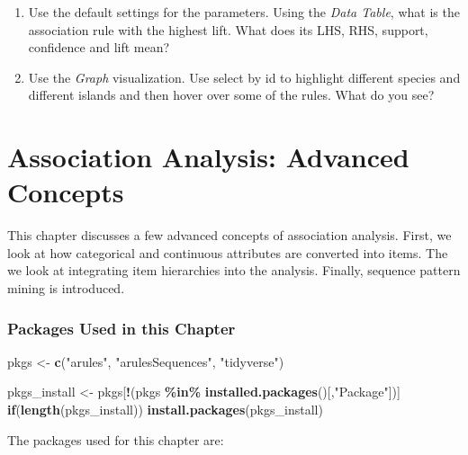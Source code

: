 \documentclass[
  notitlepage]{book}
\newenvironment{Shaded}{\begin{snugshade}}{\end{snugshade}}
\newcommand{\ControlFlowTok}[1]{\textcolor[rgb]{0.13,0.29,0.53}{\textbf{#1}}}
\newcommand{\KeywordTok}[1]{\textcolor[rgb]{0.13,0.29,0.53}{\textbf{#1}}}
\newcommand{\NormalTok}[1]{#1}
\newcommand{\OperatorTok}[1]{\textcolor[rgb]{0.81,0.36,0.00}{\textbf{#1}}}
\newcommand{\StringTok}[1]{\textcolor[rgb]{0.31,0.60,0.02}{#1}}
\begin{document}
\begin{enumerate}
\def\labelenumi{\arabic{enumi}.}
\item
  Use the default settings for the parameters.
  Using the \emph{Data Table}, what is the association rule with the highest lift. What does its LHS, RHS,
  support, confidence and lift mean?
\item
  Use the \emph{Graph} visualization. Use select by id to highlight different species and
  different islands and then hover over some of the rules. What do you see?
\end{enumerate}

\hypertarget{association-analysis-advanced-concepts}{%
\chapter{Association Analysis: Advanced Concepts}\label{association-analysis-advanced-concepts}}

This chapter discusses a few advanced concepts of association analysis.
First, we look at how categorical and continuous attributes are converted
into items. The we look at integrating item hierarchies into the analysis.
Finally, sequence pattern mining is introduced.

\hypertarget{packages-used-in-this-chapter-4}{%
\subsection*{Packages Used in this Chapter}\label{packages-used-in-this-chapter-4}}

\begin{Shaded}
\begin{Highlighting}[]
\NormalTok{pkgs \textless{}{-}}\StringTok{ }\KeywordTok{c}\NormalTok{(}\StringTok{"arules"}\NormalTok{, }\StringTok{"arulesSequences"}\NormalTok{, }\StringTok{"tidyverse"}\NormalTok{)}

\NormalTok{pkgs\_install \textless{}{-}}\StringTok{ }\NormalTok{pkgs[}\OperatorTok{!}\NormalTok{(pkgs }\OperatorTok{\%in\%}\StringTok{ }\KeywordTok{installed.packages}\NormalTok{()[,}\StringTok{"Package"}\NormalTok{])]}
\ControlFlowTok{if}\NormalTok{(}\KeywordTok{length}\NormalTok{(pkgs\_install)) }\KeywordTok{install.packages}\NormalTok{(pkgs\_install)}
\end{Highlighting}
\end{Shaded}

The packages used for this chapter are:
\end{document}
